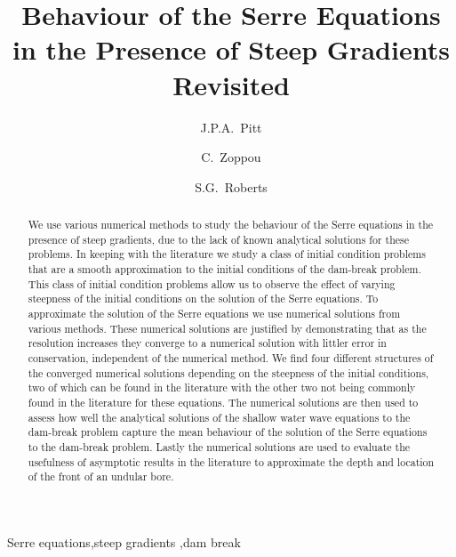 \documentclass[times]{elsarticle}
\begin{document}
\title{Behaviour of the Serre Equations in the Presence of Steep Gradients Revisited}

\author[ANU]{J.P.A.~Pitt}
\author[ANU]{C.~Zoppou}
\author[ANU]{S.G.~Roberts}

\address[ANU]{Mathematical Sciences Institute, Australian National University, Canberra, ACT 0200, Australia}
 \begin{abstract}
 We use various numerical methods to study the behaviour of the Serre equations in the presence of steep gradients, due to the lack of known analytical solutions for these problems. In keeping with the literature we study a class of initial condition problems that are a smooth approximation to the initial conditions of the dam-break problem. This class of initial condition problems allow us to observe the effect of varying steepness of the initial conditions on the solution of the Serre equations. To approximate the solution of the Serre equations we use numerical solutions from various methods. These numerical solutions are justified by demonstrating that as the resolution increases they converge to a numerical solution with littler error in conservation, independent of the numerical method. We find four different structures of the converged numerical solutions depending on the steepness of the initial conditions, two of which can be found in the literature with the other two not being commonly found in the literature for these equations. The numerical solutions are then used to assess how well the analytical solutions of the shallow water wave equations to the dam-break problem capture the mean behaviour of the solution of the Serre equations to the dam-break problem. Lastly the numerical solutions are used to evaluate the usefulness of asymptotic results in the literature to approximate the depth and location of the front of an undular bore.
 \end{abstract}	
 
  \begin{keyword}
  	Serre equations\sep steep gradients \sep dam break
  \end{keyword}
  
 \maketitle
\linenumbers
\end{document}
